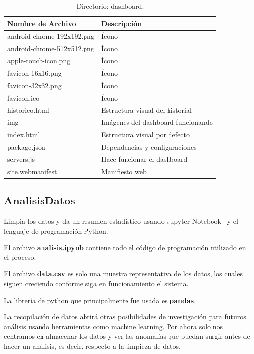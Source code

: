 \begin{table}[htbp]
\begin{center}
\caption{Directorio: dashboard.}
\begin{tabular}{|l|l|} %
\hline
\rowcolor[HTML]{C0C0C0} 
\textbf{Nombre de Archivo} & \textbf{Descripción}\\ \hline
android-chrome-192x192.png & Ícono\\ \hline
android-chrome-512x512.png & Ícono\\ \hline
apple-touch-icon.png & Ícono\\ \hline
favicon-16x16.png & Ícono\\ \hline
favicon-32x32.png & Ícono\\ \hline
favicon.ico & Ícono\\ \hline
historico.html & Estructura visual del historial\\ \hline
img & Imágenes del dashboard funcionando\\ \hline
index.html & Estructura visual por defecto\\ \hline
package.json & Dependencias y configuraciones\\ \hline
servers.js & Hace funcionar el dashboard\\ \hline
site.webmanifest & Manifiesto web\\ \hline
\end{tabular}
\label{tabla:directorioDashboard}
\end{center}
\end{table}


\subsection{AnalisisDatos}
Limpia los datos y da un resumen estadístico usando Jupyter Notebook~\cite{misc:Jupyter_Notebook} y el lenguaje de programación Python.

El archivo \textbf{analisis.ipynb} contiene todo el código de programación utilizado en el proceso. 

El archivo \textbf{data.csv} es solo una muestra representativa de los datos, los cuales siguen creciendo conforme siga en funcionamiento el sistema.

La librería de python que principalmente fue usada es \textbf{pandas}.

La recopilación de datos abrirá otras posibilidades de investigación para futuros análisis usando herramientas como machine learning. Por ahora solo nos centramos en almacenar los datos y ver las anomalías que puedan surgir antes de hacer un análisis, es decir, respecto a la limpieza de datos.


